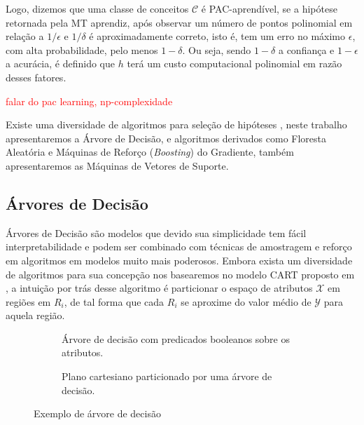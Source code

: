 Logo, dizemos que uma classe de conceitos $\mathcal{C}$ é PAC-aprendível, se a hipótese
retornada pela MT aprendiz, após observar um número de pontos polinomial em relação a
$1/\epsilon$ e $1/\delta$ é aproximadamente correto, isto é, tem um erro no máximo
$\epsilon$, com alta probabilidade, pelo menos $1-\delta$. Ou seja, sendo $1-\delta$ a
confiança e $1-\epsilon$ a acurácia, é definido que $h$ terá um custo computacional
polinomial em razão desses fatores.

\textcolor{red}{falar do pac learning, np-complexidade}

Existe uma diversidade de algoritmos para seleção de hipóteses
\cite{bishop2006pattern,friedman2001elements}, neste trabalho apresentaremos a
Árvore de Decisão, e algoritmos derivados como Floresta Aleatória e Máquinas de
Reforço (\textit{Boosting}) do Gradiente, também apresentaremos as Máquinas de
Vetores de Suporte.

\subsection{Árvores de Decisão}
Árvores de Decisão são modelos que devido sua simplicidade tem fácil
interpretabilidade e podem ser combinado com técnicas de amostragem e reforço
em algoritmos em modelos muito mais poderosos. Embora exista um diversidade de
algoritmos para sua concepção nos basearemos no modelo CART proposto em
\cite{breiman1984classification}, a intuição por trás desse algoritmo é
particionar o espaço de atributos $\mathcal{X}$ em regiões em $R_i$, de
tal forma que cada $R_i$ se aproxime do valor médio de $\mathcal{Y}$ para
aquela região.

\begin{figure}[ht]
   \centering
    \begin{subfigure}{.4\textwidth}
        \centering
        \def\svgwidth{1.4\linewidth}
        \caption{Árvore de decisão com predicados booleanos sobre os atributos.}
        \label{fig:tree}
    \end{subfigure}
     \hfill
    \begin{subfigure}{.4\textwidth}
        \centering
        \def\svgwidth{.8\linewidth}
        \caption{Plano cartesiano particionado por uma árvore de decisão.}
        \label{fig:split}
    \end{subfigure}
    \caption{Exemplo de árvore de decisão}
    \label{fig:three graphs}
\end{figure}


